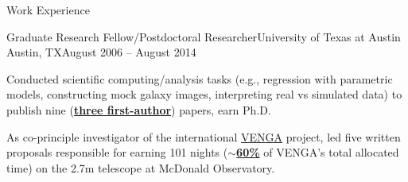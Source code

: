 \documentclass{article}
\newlength{\tabin}
\newlength{\secsep}
\newcommand{\lineunder}{\vspace*{-8pt} \\ \hspace*{-6pt} \hrulefill \\ \vspace*{-15pt}}
\newenvironment{tabbedsection}[1]{
  \begin{list}{}{
      \setlength{\itemsep}{0pt}
      \setlength{\labelsep}{0pt}
      \setlength{\labelwidth}{0pt}
      \setlength{\leftmargin}{\tabin}
      \setlength{\rightmargin}{\tabin}
      \setlength{\listparindent}{0pt}
      \setlength{\parsep}{0pt}
      \setlength{\parskip}{0pt}
      \setlength{\partopsep}{0pt}
      \setlength{\topsep}{#1}
    }
  \item[]
}{\end{list}}
\newenvironment{resume_section}[1]{
  \filbreak
  \vspace{2\secsep}
  \textsc{\large#1}
  \lineunder
  \begin{tabbedsection}{\secsep}
}{\end{tabbedsection}}
\newenvironment{subitems}{
  \renewcommand{\labelitemi}{-}
  \begin{itemize}
      \setlength{\labelsep}{1em}
}{\end{itemize}}
\newenvironment{resume_employer}[4]{
  \vspace{\secsep}
  \textbf{#1} \\ 
  \indent {\small #2} \hfill {\footnotesize#3 (#4)}
  \begin{tabbedsection}{0pt}
  \begin{subitems}
}{\end{subitems}\end{tabbedsection}}
\begin{document}
\begin{resume_section}{Work Experience}
  \begin{resume_employer}{Graduate Research Fellow/Postdoctoral Researcher}{University of Texas at Austin}
  {Austin, TX}{August 2006 -- August 2014}
    \item Conducted scientific computing/analysis tasks (e.g., regression with parametric models, constructing mock galaxy images, interpreting real vs simulated data) to publish nine (\underline{\textbf{three first-author}}) papers, earn Ph.D. 
    \item As co-principle investigator of the international 
\href{https://users.obs.carnegiescience.edu/gblancm/venga.html}{VENGA}
project, led five written proposals responsible for earning 101 nights (\underline{\textbf{$\sim$60\%}} of VENGA's total allocated time) on
    the 2.7m telescope at McDonald Observatory.
  \end{resume_employer}



\end{resume_section}

\iffalse %
\begin{resume_section}{Personal Data Science Projects}
\begin{subitems}

\item Created a \href{http://loveofdatascience.blogspot.com/}{blog} to highlight self-guided data science projects
involving machine learning (e.g., 
\href{http://loveofdatascience.blogspot.co.uk/2014/01/gender-classification-with-machine.html}{gender classification}, 
\href{http://loveofdatascience.blogspot.co.uk/2016/07/naive-bayes-text-classification-of.html}{document classification}), 
text mining (e.g., \href{http://loveofdatascience.blogspot.co.uk/2016/05/how-to-save-earth-with-word-association.html}{word associations and topic modeling}), 
\href{http://loveofdatascience.blogspot.co.uk/2014/09/web-crawling-for-job-postings.html}{web scraping},
\href{http://loveofdatascience.blogspot.co.uk/2015/12/does-congressional-approval-rating-vary.html}{hypothesis testing}, and data visualization (e.g., 
\href{http://loveofdatascience.blogspot.co.uk/2016/09/graph-analysis-of-leaked-democratic.html}{network maps with an R Shiny web application}). 

\end{subitems}
\end{resume_section}
\fi
\end{document}

